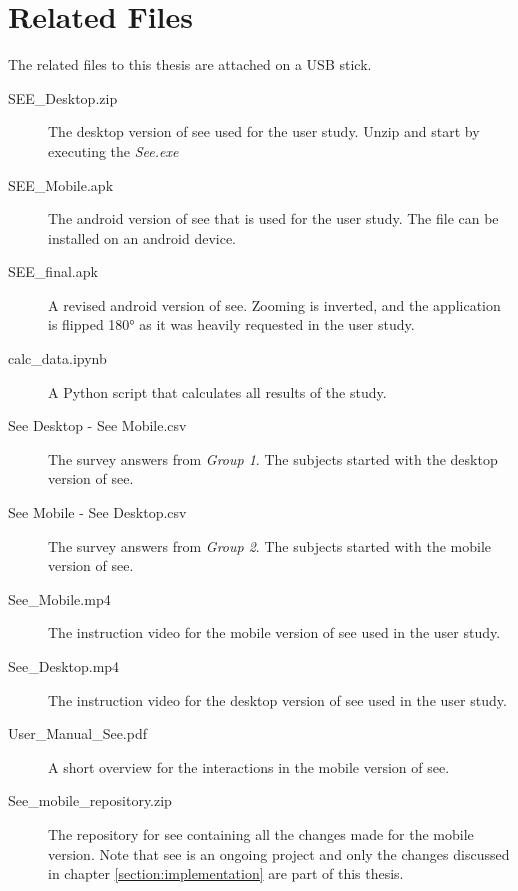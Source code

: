 \section{Related Files}

The related files to this thesis are attached on a USB stick.

\begin{description}
    \item[SEE\_Desktop.zip] \label{file:desktop} The desktop version of \gls{see} used for the user study. Unzip and start by executing the \textit{See.exe}
    \item[SEE\_Mobile.apk] The \gls{android} version of \gls{see} that is used for the user study. The file can be installed on an \gls{android} device.
    \item[SEE\_final.apk] A revised \gls{android} version of \gls{see}. Zooming is inverted, and the application is flipped 180° as it was heavily requested in the user study.
    \item[calc\_data.ipynb] \label{calc} A Python script that calculates all results of the study.
    \item[See Desktop - See Mobile.csv] The survey answers from \textit{Group 1}. The subjects started with the desktop version of \gls{see}.
    \item[See Mobile - See Desktop.csv] The survey answers from \textit{Group 2}. The subjects started with the mobile version of \gls{see}.
    \item[See\_Mobile.mp4] The instruction video for the mobile version of \gls{see} used in the user study.
    \item[See\_Desktop.mp4] The instruction video for the desktop version of \gls{see} used in the user study.
    \item[User\_Manual\_See.pdf] A short overview for the interactions in the mobile version of \gls{see}.
    \item[See\_mobile\_repository.zip] The repository for \gls{see} containing all the changes made for the mobile version. Note that \gls{see} is an ongoing project and only the changes discussed in chapter \ref{section:implementation} are part of this thesis.
\end{description}

